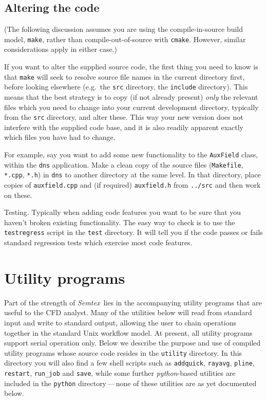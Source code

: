 \documentclass[11pt]{report}
\newcommand{\Semtex}{\emph{Semtex}} \newcommand{\Dog}{\emph{Dog}}
\newcommand{\eg}{e.g.\ } \newcommand{\CC}{\mathrm{c.c.}}
\begin{document}
\section{Altering the code}
\label{sec.alt}

(The following discussion assumes you are using the compile-in-source
build model, \ie \verb|make|, rather than compile-out-of-source with
\verb|cmake|. However, similar considerations apply in either case.)

If you want to alter the supplied source code, the first thing you
need to know is that \texttt{make} will seek to resolve source file
names in the current directory first, before looking elsewhere
(\eg the \texttt{src} directory, the \texttt{include} directory).
This means that the best strategy is to copy (if not already present)
\emph{only} the relevant files which you need to change into your
current development directory, typically from the \texttt{src}
directory, and alter these. This way your new version does not
interfere with the supplied code base, and it is also readily apparent
exactly which files you have had to change.

For example, say you want to add some new functionality to the
\texttt{AuxField} class, within the \texttt{dns} application. Make a
clean copy of the source files (\texttt{Makefile}, \texttt{*.cpp},
\texttt{*.h}) in \texttt{dns} to another directory at the same
level. In that directory, place copies of \texttt{auxfield.cpp} and (if
required) \texttt{auxfield.h} from \texttt{../src} and then work on
these.

Testing.  Typically when adding code features you want to be sure that
you haven't broken existing functionality.  The easy way to check is
to use the \verb|testregress| script in the \verb|test| directory. It
will tell you if the code passes or fails standard regression tests
which exercise most code features.


\chapter{Utility programs}
\label{ch.utilities}

Part of the strength of \Semtex\ lies in the accompanying utility
programs that are useful to the CFD analyst.  Many of the utilities
below will read from standard input and write to standard output,
allowing the user to chain operations together in the standard Unix
workflow model. At present, all utility programs support serial
operation only.  Below we describe the purpose and use of compiled
utility programs whose source code resides in the \verb|utility|
directory.  In this directory you will also find a few shell scripts
such as \verb|addquick|, \verb|rayavg|, \verb|pline|, \verb|restart|,
\verb|run_job| and \verb|save|, while some further \emph{python}-based
utilities are included in the \verb|python| directory\,---\,none of
these utilities are as yet documented below.
\end{document}
